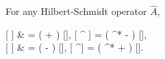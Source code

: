 \begin{theorem}
\label{thm:wigner:func:correspondences}
	For any Hilbert-Schmidt operator $\hat{A}$,
	\begin{eqn*}
		 [ \Psiop {} ]
			& = \left( \Psi +  \frac{\fdelta}{\fdelta \Psi^*} \right) ,
		\quad
		 [ \Psiop^\dagger {} ]
			= \left( \Psi^* -  \frac{\fdelta}{\fdelta \Psi} \right) , \\
		 [  \Psiop ]
			& = \left( \Psi -  \frac{\fdelta}{\fdelta \Psi^*} \right) ,
		\quad
		 [  \Psiop^\dagger ]
			= \left( \Psi^* +  \frac{\fdelta}{\fdelta \Psi} \right) .
	\end{eqn*}
\end{theorem}
